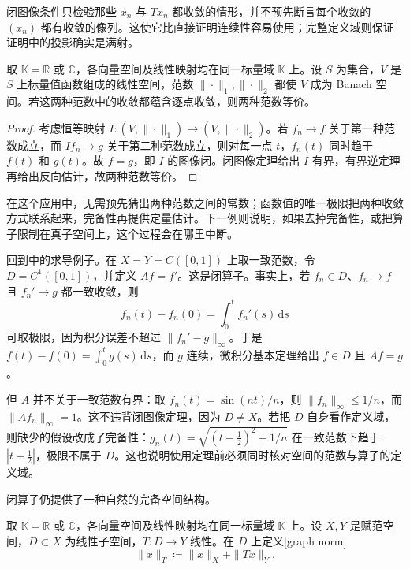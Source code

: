 闭图像条件只检验那些 \(x_n\) 与 \(Tx_n\) 都收敛的情形，并不预先断言每个收敛的 \((x_n)\) 都有收敛的像列。这使它比直接证明连续性容易使用；完整定义域则保证证明中的投影确实是满射。

\begin{corollary}[函数空间的完备范数比较]
\label{b1:cor:function-space-banach-norms}
取 \(\mathbb K=\mathbb R\) 或 \(\mathbb C\)，各向量空间及线性映射均在同一标量域 \(\mathbb K\) 上。设 \(S\) 为集合，\(V\) 是 \(S\) 上标量值函数组成的线性空间，范数 \(\|\cdot\|_1,\|\cdot\|_2\) 都使 \(V\) 成为 Banach 空间。若这两种范数中的收敛都蕴含逐点收敛，则两种范数等价。
\end{corollary}

\begin{proof}
考虑恒等映射 \(I:(V,\|\cdot\|_1)\to(V,\|\cdot\|_2)\)。若 \(f_n\to f\) 关于第一种范数成立，而 \(If_n\to g\) 关于第二种范数成立，则对每一点 \(t\)，\(f_n(t)\) 同时趋于 \(f(t)\) 和 \(g(t)\)。故 \(f=g\)，即 \(I\) 的图像闭。闭图像定理给出 \(I\) 有界，有界逆定理再给出反向估计，故两种范数等价。
\end{proof}

在这个应用中，无需预先猜出两种范数之间的常数；函数值的唯一极限把两种收敛方式联系起来，完备性再提供定量估计。下一例则说明，如果去掉完备性，或把算子限制在真子空间上，这个过程会在哪里中断。

\ProseParagraphBreak

回到中的求导例子。在 \(X=Y=C([0,1])\) 上取一致范数，令 \(D=C^1([0,1])\)，并定义 \(Af=f'\)。这是闭算子。事实上，若 \(f_n\in D\)、\(f_n\to f\) 且 \(f_n'\to g\) 都一致收敛，则
\[
 f_n(t)-f_n(0)=\int_0^t f_n'(s)\,\mathrm ds
\]
可取极限，因为积分误差不超过 \(\|f_n'-g\|_\infty\)。于是
\(f(t)-f(0)=\int_0^t g(s)\,\mathrm ds\)，而 \(g\) 连续，微积分基本定理给出 \(f\in D\) 且 \(Af=g\)。

\ProseParagraphBreak

但 \(A\) 并不关于一致范数有界：取 \(f_n(t)=\sin(nt)/n\)，则 \(\|f_n\|_\infty\le1/n\)，而 \(\|Af_n\|_\infty=1\)。这不违背闭图像定理，因为 \(D\ne X\)。若把 \(D\) 自身看作定义域，则缺少的假设改成了完备性：\(g_n(t)=\sqrt{(t-\tfrac12)^2+1/n}\) 在一致范数下趋于 \(|t-\tfrac12|\)，极限不属于 \(D\)。这也说明使用定理前必须同时核对空间的范数与算子的定义域。

\ProseParagraphBreak

闭算子仍提供了一种自然的完备空间结构。

\begin{definition}
\label{b1:def:graph-norm}
取 \(\mathbb K=\mathbb R\) 或 \(\mathbb C\)，各向量空间及线性映射均在同一标量域 \(\mathbb K\) 上。设 \(X,Y\) 是赋范空间，\(D\subset X\) 为线性子空间，\(T:D\to Y\) 线性。在 \(D\) 上定义[graph norm]
\[
 \|x\|_T\coloneqq\|x\|_X+\|Tx\|_Y.
\]
\end{definition}

